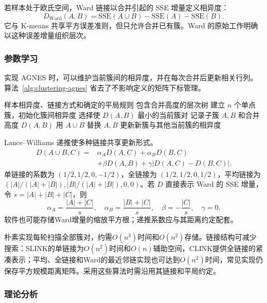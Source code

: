 若样本处于欧氏空间，Ward 链接以合并引起的 SSE 增量定义相异度：
\[
 D_{\mathrm{Ward}}(A,B)
 =\mathrm{SSE}(A\cup B)-\mathrm{SSE}(A)-\mathrm{SSE}(B).
\]
它与 K-means 共享平方误差准则，但只允许合并已有簇。Ward 的原始工作明确以这种误差增量组织层次。

\subsubsection{参数学习}

实现 AGNES 时，可以维护当前簇间的相异度，并在每次合并后更新相关行列。算法~\ref{alg:clustering-agnes} 省去了不影响定义的矩阵下标管理。

\begin{algorithm}[凝聚层次聚类]
 \label{alg:clustering-agnes}
 \begin{algorithmic}[1]
 \Require 样本相异度、链接方式和确定的平局规则
 \Ensure 包含合并高度的层次树
 \State 建立 $n$ 个单点簇，初始化簇间相异度
  \State 选择使 $D(A,B)$ 最小的当前簇对
  \State 记录子簇 $A,B$ 和合并高度 $D(A,B)$
  \State 用 $A\cup B$ 替换 $A,B$
  \State 更新新簇与其他当前簇的相异度
 \EndWhile
 \end{algorithmic}
\end{algorithm}

Lance--Williams 递推使多种链接共享更新形式。
\begin{equation}
 \begin{aligned}
 D(A\cup B,C)={}&\alpha_A D(A,C)+\alpha_B D(B,C)\\
 &+\beta D(A,B)
 +\gamma|D(A,C)-D(B,C)|.
 \end{aligned}
 \label{eq:clustering-lance-williams}
\end{equation}
单链接的系数为 $(1/2,1/2,0,-1/2)$，全链接为 $(1/2,1/2,0,1/2)$，平均链接为 $(|A|/(|A|+|B|),|B|/(|A|+|B|),0,0)$。若 $D$ 直接表示 Ward 的 SSE 增量，令 $s=|A|+|B|+|C|$，则
\[
 \alpha_A=\frac{|A|+|C|}{s},\quad
 \alpha_B=\frac{|B|+|C|}{s},\quad
 \beta=-\frac{|C|}{s},\quad \gamma=0.
\]
软件也可能存储Ward增量的缩放平方根；递推系数应与其距离约定配套。

朴素实现每轮扫描全部簇对，约需$O(n^3)$时间和$O(n^2)$存储。链接结构可减少搜索：SLINK的单链接为$O(n^2)$时间和$O(n)$辅助空间，CLINK提供全链接的紧凑表示；平均、全链接和Ward的最近邻链实现也可达到$O(n^2)$时间，常见实现仍保存平方规模距离矩阵。采用这些算法时需沿用其链接和平局约定。

\subsubsection{理论分析}

